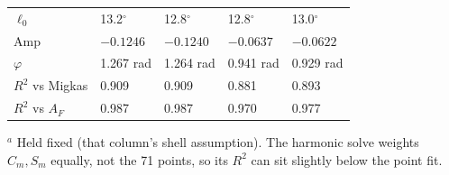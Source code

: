 \documentclass[10pt]{article}
\begin{document}
{\begin{center}
\begin{tabular}{lllll}
$\ell_0$ & 13.2$^\circ$ & 12.8$^\circ$ & 12.8$^\circ$ & 13.0$^\circ$\\
Amp & $-0.1246$ & $-0.1240$ & $-0.0637$ & $-0.0622$\\
$\varphi$ & 1.267 rad & 1.264 rad & 0.941 rad & 0.929 rad\\
$R^2$ vs Migkas & 0.909 & 0.909 & 0.881 & 0.893\\
$R^2$ vs $A_F$ & 0.987 & 0.987 & 0.970 & 0.977\\
\bottomrule
\end{tabular}\end{center}
\vspace{-3pt}
{\footnotesize $^a$ Held fixed (that column's shell assumption). The harmonic solve weights $C_m,S_m$ equally, not the 71 points, so its $R^2$ can sit slightly below the point fit.}


}
\end{document}
